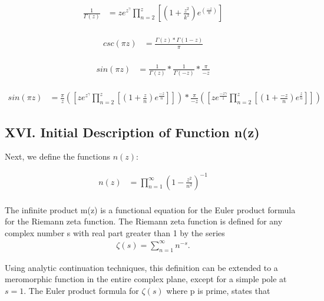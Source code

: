 \documentclass{article}
\begin{document}
\begin{align*}
\frac{1}{\Gamma\left(z\right)} &= ze^z^\gamma \prod_{n=2}^z\left[\left(1 + \frac{z^2}{k^2}\right)e^\left(\frac{-z}{n}\right)\right] \\
\end{align*}

\begin{align*}
csc(\pi z) &= \frac{\Gamma\left(z\right) * \Gamma\left(1 - z\right)}{\pi} \\
\end{align*}

\begin{align*}
sin(\pi z) &= \frac{1}{\Gamma\left(z\right)} * \frac{1}{\Gamma\left(- z\right)} * \frac{\pi}{-z} \\
\end{align*}

\begin{align*}
sin(\pi z) &= \frac{\pi}{z} \left(\left[ze^z^\gamma \prod_{n=2}^z \left[\left(1 + \frac{z}{n}\right)e^\frac{-z}{n}\right]\right]\right) * \frac{\pi}{-z} \left(\left[ze^\frac{-z\gamma}{1} \prod_{n=2}^z \left[\left(1 + \frac{-z}{n}\right)e^\frac{z}{n}\right]\right]\right)
\end{align*}

\newpage
\subsection*{XVI. Initial Description of Function n(z)}
Next, we define the functions $n(z)$:

\begin{align*}
n(z) &= \prod_{n=1}^\infty \left(1 - \frac{z^2}{n^2}\right)^{-1} \\
\end{align*}

The infinite product m(z) is a functional equation for the Euler product formula for the Riemann zeta function. The Riemann zeta function is defined for any complex number s with real part greater than 1 by the series \\

\begin{align*}
\zeta(s) = \sum_{n=1}^\infty n^{-s}.
\end{align*}

Using analytic continuation techniques, this definition can be extended to a meromorphic function in the entire complex plane, except for a simple pole at $s=1$. The Euler product formula for $\zeta\left(s\right)$ where p is prime, states that \\
\end{document}
